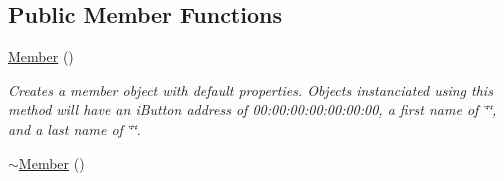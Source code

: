 \subsection*{Public Member Functions}
\begin{DoxyCompactItemize}
\item 
\hypertarget{class_member_a44241aa6aa9b792b550d9cc29e7ad050}{\hyperlink{class_member_a44241aa6aa9b792b550d9cc29e7ad050}{Member} ()}\label{class_member_a44241aa6aa9b792b550d9cc29e7ad050}

\begin{DoxyCompactList}\small\item\em Creates a member object with default properties. Objects instanciated using this method will have an i\-Button address of 00\-:00\-:00\-:00\-:00\-:00\-:00, a first name of \char`\"{}\char`\"{}, and a last name of \char`\"{}\char`\"{}. \end{DoxyCompactList}\item 
\hypertarget{class_member_a4f5d7cb8788247f65f10b5b81be4a4ab}{\hyperlink{class_member_a4f5d7cb8788247f65f10b5b81be4a4ab}{$\sim$\-Member} ()}\label{class_member_a4f5d7cb8788247f65f10b5b81be4a4ab}


\end{DoxyCompactItemize}
